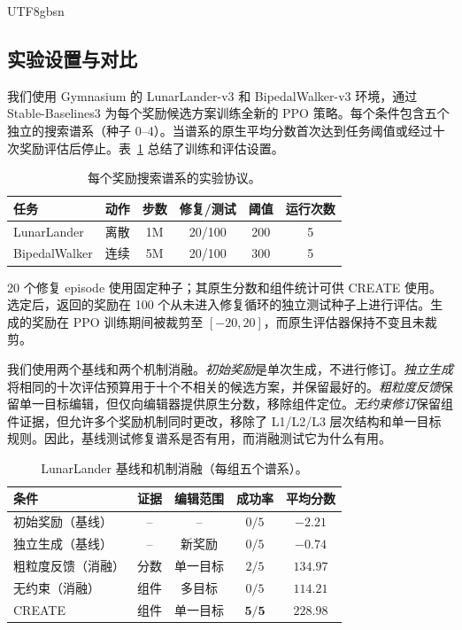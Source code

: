 \documentclass[conference]{IEEEtran}
\begin{document}
\begin{CJK}{UTF8}{gbsn}
\subsection{实验设置与对比}
我们使用 Gymnasium 的 LunarLander-v3 和 BipedalWalker-v3 环境，通过 Stable-Baselines3 为每个奖励候选方案训练全新的 PPO 策略。每个条件包含五个独立的搜索谱系（种子 0--4）。当谱系的原生平均分数首次达到任务阈值或经过十次奖励评估后停止。表~\ref{tab:protocol} 总结了训练和评估设置。

\begin{table}[H]
\caption{每个奖励搜索谱系的实验协议。}
\label{tab:protocol}
\centering
\scriptsize
\setlength{\tabcolsep}{2.7pt}
\begin{tabular}{lccccc}
\toprule
任务 & 动作 & 步数 & 修复/测试 & 阈值 & 运行次数 \\
\midrule
LunarLander & 离散 & 1M & 20/100 & 200 & 5 \\
BipedalWalker & 连续 & 5M & 20/100 & 300 & 5 \\
\bottomrule
\end{tabular}
\end{table}

20 个修复 episode 使用固定种子；其原生分数和组件统计可供 CREATE 使用。选定后，返回的奖励在 100 个从未进入修复循环的独立测试种子上进行评估。生成的奖励在 PPO 训练期间被裁剪至 $[-20, 20]$，而原生评估器保持不变且未裁剪。

我们使用两个基线和两个机制消融。\emph{初始奖励}是单次生成，不进行修订。\emph{独立生成}将相同的十次评估预算用于十个不相关的候选方案，并保留最好的。\emph{粗粒度反馈}保留单一目标编辑，但仅向编辑器提供原生分数，移除组件定位。\emph{无约束修订}保留组件证据，但允许多个奖励机制同时更改，移除了 L1/L2/L3 层次结构和单一目标规则。因此，基线测试修复谱系是否有用，而消融测试它为什么有用。

\begin{table}[H]
\caption{LunarLander 基线和机制消融（每组五个谱系）。}
\label{tab:baseline}
\centering
\scriptsize
\setlength{\tabcolsep}{3.1pt}
\begin{tabular}{lcccc}
\toprule
条件 & 证据 & 编辑范围 & 成功率 & 平均分数 \\
\midrule
初始奖励（基线）& -- & -- & $0/5$ & $-2.21$ \\
独立生成（基线）& -- & 新奖励 & $0/5$ & $-0.74$ \\
粗粒度反馈（消融）& 分数 & 单一目标 & $2/5$ & $134.97$ \\
无约束（消融）& 组件 & 多目标 & $0/5$ & $114.21$ \\
CREATE & 组件 & 单一目标 & $\mathbf{5/5}$ & $\mathbf{228.98}$ \\
\bottomrule
\end{tabular}
\end{table}


\end{CJK}
\end{document}
